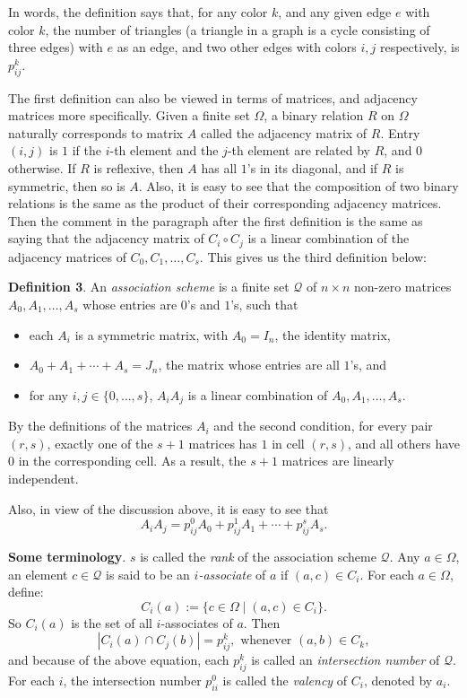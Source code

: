 \documentclass[12pt]{article}
\begin{document}
In words, the definition says that, for any color $k$, and any given edge $e$ with color $k$, the number of triangles (a triangle in a graph is a cycle consisting of three edges) with $e$ as an edge, and two other edges with colors $i,j$ respectively, is $p_{ij}^k$.

The first definition can also be viewed in terms of matrices, and adjacency matrices more specifically.  Given a finite set $\Omega$, a binary relation $R$ on $\Omega$ naturally corresponds to matrix $A$ called the adjacency matrix of $R$.  Entry $(i,j)$ is $1$ if the $i$-th element and the $j$-th element are related by $R$, and $0$ otherwise.  If $R$ is reflexive, then $A$ has all $1$'s in its diagonal, and if $R$ is symmetric, then so is $A$.  Also, it is easy to see that the composition of two binary relations is the same as the product of their corresponding adjacency matrices.  Then the comment in the paragraph after the first definition is the same as saying that the adjacency matrix of $C_i\circ C_j$ is a linear combination of the adjacency matrices of $C_0,C_1,\ldots, C_s$.  This gives us the third definition below:

\textbf{Definition 3}.  An \emph{association scheme} is a finite set $\mathscr{Q}$ of $n\times n$ non-zero matrices $A_0, A_1,\ldots,A_s$ whose entries are $0$'s and $1$'s, such that
\begin{itemize}
\item each $A_i$ is a symmetric matrix, with $A_0=I_n$, the identity matrix,
\item $A_0+A_1+\cdots + A_s = J_n$, the matrix whose entries are all $1$'s, and
\item for any $i,j\in \lbrace 0,\ldots, s\rbrace$, $A_iA_j$ is a linear combination of $A_0,A_1,\ldots, A_s$.
\end{itemize}

By the definitions of the matrices $A_i$ and the second condition, for every pair $(r,s)$, exactly one of the $s+1$ matrices has $1$ in cell $(r,s)$, and all others have $0$ in the corresponding cell.  As a result, the $s+1$ matrices are linearly independent.  

Also, in view of the discussion above, it is easy to see that 
$$A_iA_j=p_{ij}^0 A_0 + p_{ij}^1 A_1 + \cdots + p_{ij}^s A_s.$$

\textbf{Some terminology}.  $s$ is called the \emph{rank} of the association scheme $\mathscr{Q}$.  Any $a\in \Omega$, an element $c\in \mathscr{Q}$ is said to be an \emph{$i$-associate} of $a$ if $(a,c)\in C_i$.  For each $a\in \Omega$, define: $$C_i(a):=\lbrace c\in \Omega\mid (a,c)\in C_i\rbrace.$$ So $C_i(a)$ is the set of all $i$-associates of $a$.  Then 
$$|C_i(a)\cap C_j(b)|=p_{ij}^k,\mbox{ whenever }(a,b)\in C_k,$$
and because of the above equation, each $p_{ij}^k$ is called an \emph{intersection number} of $\mathscr{Q}$.  For each $i$, the intersection number $p_{ii}^0$ is called the \emph{valency} of $C_i$, denoted by $a_i$.
\end{document}
